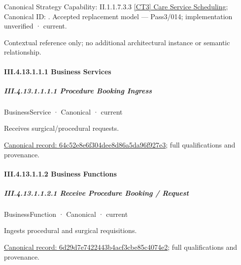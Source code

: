 {\small Canonical Strategy Capability: II.1.1.7.3.3 \hyperref[element:e77883e9c25c43fabdfb7dbeb8fbffe3]{[CT3] Care Service Scheduling}; Canonical ID: \texttt{}. Accepted replacement model — Pass3/014; implementation unverified · current.}\par
Contextual reference only; no additional architectural instance or semantic relationship.\par
\paragraph*{III.4.13.1.1.1 Business Services}
\label{navigation:III.4.13.1.1.1}

\subparagraph*{III.4.13.1.1.1.1 Procedure Booking Ingress}
\label{navigation:III.4.13.1.1.1.1}

\label{element:64c52e8e6f304dee8d86a5da96f927e3}
{\small BusinessService · Canonical · current}\par

Receives surgical/procedural requests.


{\footnotesize \href{../../../../../../../continuum/business/business-service/64c52e8e6f304dee8d86a5da96f927e3.md}{Canonical record: 64c52e8e6f304dee8d86a5da96f927e3}; full qualifications and provenance.}\par
\paragraph*{III.4.13.1.1.2 Business Functions}
\label{navigation:III.4.13.1.1.2}

\subparagraph*{III.4.13.1.1.2.1 Receive Procedure Booking / Request}
\label{navigation:III.4.13.1.1.2.1}

\label{element:6d29d7e7422443b4acf3cbe85c4074e2}
{\small BusinessFunction · Canonical · current}\par

Ingests procedural and surgical requisitions.


{\footnotesize \href{../../../../../../../continuum/business/business-function/6d29d7e7422443b4acf3cbe85c4074e2.md}{Canonical record: 6d29d7e7422443b4acf3cbe85c4074e2}; full qualifications and provenance.}\par
